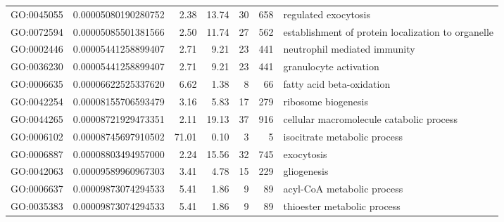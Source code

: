 \documentclass[letterpaper,12pt]{article}
\numberwithin{equation}{appendix}
\begin{document}
\begin{landscape}
{{\begin{longtable}{lrrrrrl}
  GO:0045055 & 0.00005080190280752 & 2.38 & 13.74 & 30 & 658 & regulated exocytosis \\ 
  GO:0072594 & 0.00005085501381566 & 2.50 & 11.74 & 27 & 562 & establishment of protein localization to organelle \\ 
  GO:0002446 & 0.00005441258899407 & 2.71 & 9.21 & 23 & 441 & neutrophil mediated immunity \\ 
  GO:0036230 & 0.00005441258899407 & 2.71 & 9.21 & 23 & 441 & granulocyte activation \\ 
  GO:0006635 & 0.00006622525337620 & 6.62 & 1.38 & 8 & 66 & fatty acid beta-oxidation \\ 
  GO:0042254 & 0.00008155706593479 & 3.16 & 5.83 & 17 & 279 & ribosome biogenesis \\ 
  GO:0044265 & 0.00008721929473351 & 2.11 & 19.13 & 37 & 916 & cellular macromolecule catabolic process \\ 
  GO:0006102 & 0.00008745697910502 & 71.01 & 0.10 & 3 & 5 & isocitrate metabolic process \\ 
  GO:0006887 & 0.00008803494957000 & 2.24 & 15.56 & 32 & 745 & exocytosis \\ 
  GO:0042063 & 0.00009589960967303 & 3.41 & 4.78 & 15 & 229 & gliogenesis \\ 
  GO:0006637 & 0.00009873074294533 & 5.41 & 1.86 & 9 & 89 & acyl-CoA metabolic process \\ 
  GO:0035383 & 0.00009873074294533 & 5.41 & 1.86 & 9 & 89 & thioester metabolic process \\ 
   \bottomrule
\end{longtable}
}}
\end{landscape}
\end{document}
